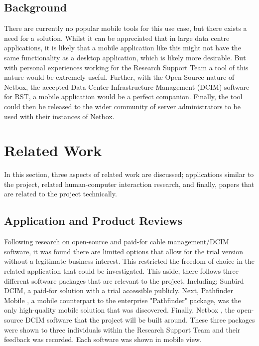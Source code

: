 \documentclass [11pt,a4paper]{article}
\begin{document}
\subsection{Background}
\label{sec:background}

There are currently no popular mobile tools for this use case, but there exists a need for a solution. Whilst it can be appreciated that in large data centre applications, it is likely that a mobile application like this might not have the same functionality as a desktop application, which is likely more desirable. But with personal experiences working for the Research Support Team a tool of this nature would be extremely useful. Further, with the Open Source nature of Netbox, the accepted Data Center Infrastructure Management (DCIM) software for RST, a mobile application would be a perfect companion. Finally, the tool could then be released to the wider community of server administrators to be used with their instances of Netbox.

\section{Related Work}

In this section, three aspects of related work are discussed; applications similar to the project, related human-computer interaction research, and finally, papers that are related to the project technically.

\subsection{Application and Product Reviews}
\label{sec:app_reviews}

Following research on open-source and paid-for cable management/DCIM software, it was found there are limited options that allow for the trial version without a legitimate business interest. This restricted the freedom of choice in the related application that could be investigated. This aside, there follows three different software packages that are relevant to the project. Including; Sunbird DCIM\cite{Sunbird}, a paid-for solution with a trial accessible publicly. Next, Pathfinder Mobile \cite{Pathfinder}, a mobile counterpart to the enterprise "Pathfinder" package, was the only high-quality mobile solution that was discovered. Finally, Netbox \cite{Netbox}, the open-source DCIM software that the project will be built around. These three packages were shown to three individuals within the Research Support Team and their feedback was recorded. Each software was shown in mobile view. 
\end{document}

